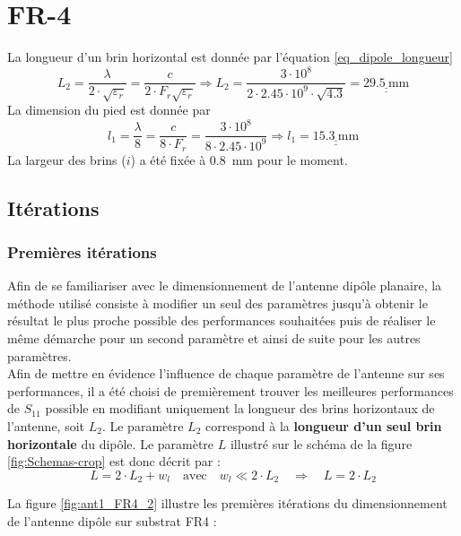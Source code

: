 \documentclass[Deriaz_Traiber_Labo02]{subfiles}
\begin{document}
\section{FR-4}
La longueur d'un brin horizontal est donnée par l'équation \ref{eq_dipole_longueur}
\begin{equation}
\boxed{L_2 = \dfrac{\lambda}{2 \cdot \sqrt{\varepsilon_r}} = \dfrac{c}{2 \cdot F_r \sqrt{\varepsilon_r}}} \Rightarrow L_2 = \dfrac{3\cdot10^8}{2\cdot2.45\cdot1 0^9\cdot \sqrt{4.3}} = \underline{\underline{\SI{29.5}{\milli\meter}}}
\label{eq_dipole_longueur}
\end{equation}
La dimension du pied est donnée par
\begin{equation}
\boxed{l_1=\frac{\lambda}{8}=\frac{c}{8 \cdot F_r}} = \frac{3\cdot 10^8}{8\cdot 2.45\cdot 10^9} \Rightarrow l_1 = \underline{\underline{\SI{15.3}{\milli\meter}}}
\end{equation}
La largeur des brins ($i$) a été fixée à \SI{0.8}{\milli\meter} pour le moment.
\subsection{Itérations}
\subsubsection{Premières itérations}

Afin de se familiariser avec le dimensionnement de l'antenne dipôle planaire, la méthode utilisé consiste à modifier un seul des paramètres jusqu'à obtenir le résultat le plus proche possible des performances souhaitées puis de réaliser le même démarche pour un second paramètre et ainsi de suite pour les autres paramètres.\\

Afin de mettre en évidence l'influence de chaque paramètre de l'antenne sur ses performances, il a été choisi de premièrement trouver les meilleures performances de $S_{11}$ possible en modifiant uniquement la longueur des brins horizontaux de l'antenne, soit $L_2$. Le paramètre $L_2$ correspond à la \textbf{longueur d'un seul brin horizontale} du dipôle. Le paramètre $L$ illustré sur le schéma de la figure \ref{fig:Schemas-crop} est donc décrit par :
$$
L = 2\cdot L_2 + w_l 	\quad \text{avec} \quad  w_l \ll 2 \cdot L_2  \quad \Rightarrow \quad \boxed{L = 2\cdot L_2}
$$

\pagebreak

\begin{flushleft}
La figure \ref{fig:ant1_FR4_2} illustre les premières itérations du dimensionnement de l'antenne dipôle sur substrat FR4 :
\end{flushleft}
\end{document}
